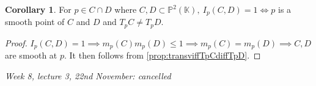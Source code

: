 \documentclass{article}
\newcommand{\K}{\mathbb{K}}
\newcommand{\p}{\mathbb{P}}
\theoremstyle{definition}
\newtheorem{coro}[defn]{Corollary}
\begin{document}
\begin{coro}
For $p\in C\cap D$ where $C,D\subset\p^2(\K),\ I_p(C,D)=1\iff p$ is a smooth point of $C$ and $D$ and $T_pC\neq T_pD$.
\end{coro}
\begin{proof}
$I_p(C,D)=1\implies m_p(C)m_p(D)\leq 1\implies m_p(C)=m_p(D)\implies C,D$ are smooth at $p$. It then follows from \ref{prop:transviffTpCdiffTpD}.
\end{proof}

\begin{flushright}
\textit{Week 8, lecture 3, 22nd November: cancelled}
\end{flushright}
\end{document}
